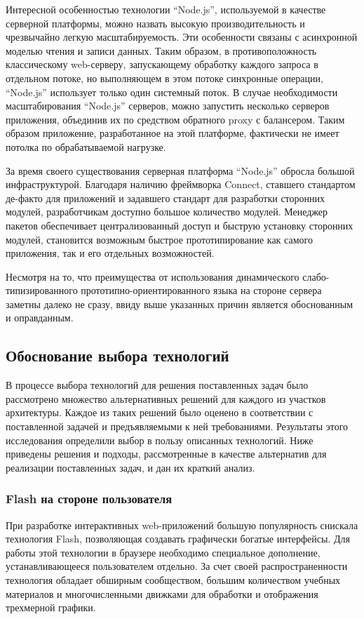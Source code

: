 Интересной особенностью технологии ``Node.js'', используемой в качестве серверной
платформы, можно назвать высокую производительность и чрезвычайно легкую
масштабируемость. Эти особенности связаны с асинхронной моделью чтения и записи
данных. Таким образом, в противоположность классическому web-серверу,
запускающему обработку каждого запроса в отдельном потоке, но выполняющем в этом
потоке синхронные операции, ``Node.js'' использует только один системный поток.
В случае необходимости масштабирования ``Node.js'' серверов, можно запустить
несколько серверов приложения, объединив их по средством обратного proxy с
балансером. Таким образом приложение, разработанное на этой платформе,
фактически не имеет потолка по обрабатываемой нагрузке.

За время своего существования серверная платформа ``Node.js'' обросла большой
инфраструктурой. Благодаря наличию фреймворка Connect, ставшего стандартом
де-факто для приложений и задавшего стандарт для разработки сторонних модулей,
разработчикам доступно большое количество модулей. Менеджер пакетов обеспечивает
централизованный доступ и быструю установку сторонних модулей, становится
возможным быстрое прототипирование как самого приложения, так и его отдельных
возможностей.

Несмотря на то, что преимущества от использования динамического
слабо-типизированного прототипно-ориентированного языка на стороне сервера
заметны далеко не сразу, ввиду выше указанных причин является
обоснованным и оправданным.

\subsection{Обоснование выбора технологий}

В процессе выбора технологий для решения поставленных задач было
рассмотрено множество альтернативных решений для каждого из участков
архитектуры. Каждое из таких решений было оценено в соответствии с
поставленной задачей и предъявляемыми к ней требованиями. Результаты
этого исследования определили выбор в пользу описанных технологий. Ниже
приведены решения и подходы, рассмотренные в качестве альтернатив для
реализации поставленных задач, и дан их краткий анализ.

\subsubsection{Flash на стороне пользователя}

При разработке интерактивных web-приложений большую популярность снискала
технология Flash, позволяющая создавать графически богатые интерфейсы. Для
работы этой технологии в браузере необходимо специальное дополнение,
устанавливающееся пользователем отдельно. За счет
своей распространенности технология обладает обширным сообществом, большим
количеством учебных материалов и многочисленными движками для обработки и
отображения трехмерной графики.

